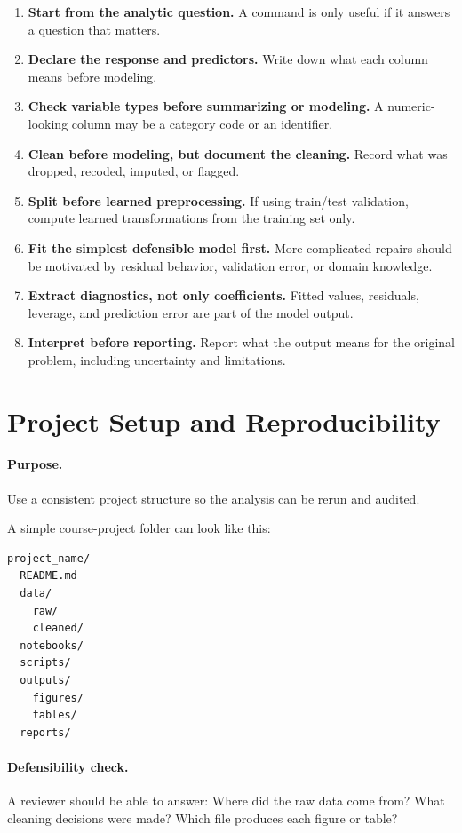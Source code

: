 \begin{enumerate}
  \item \textbf{Start from the analytic question.}  A command is only useful if it answers a question that matters.
  \item \textbf{Declare the response and predictors.}  Write down what each column means before modeling.
  \item \textbf{Check variable types before summarizing or modeling.}  A numeric-looking column may be a category code or an identifier.
  \item \textbf{Clean before modeling, but document the cleaning.}  Record what was dropped, recoded, imputed, or flagged.
  \item \textbf{Split before learned preprocessing.}  If using train/test validation, compute learned transformations from the training set only.
  \item \textbf{Fit the simplest defensible model first.}  More complicated repairs should be motivated by residual behavior, validation error, or domain knowledge.
  \item \textbf{Extract diagnostics, not only coefficients.}  Fitted values, residuals, leverage, and prediction error are part of the model output.
  \item \textbf{Interpret before reporting.}  Report what the output means for the original problem, including uncertainty and limitations.
\end{enumerate}

\section{Project Setup and Reproducibility}
\label{app:cookbook-project-setup}

\paragraph{Purpose.} Use a consistent project structure so the analysis can be rerun and audited.

A simple course-project folder can look like this:

\begin{verbatim}
project_name/
  README.md
  data/
    raw/
    cleaned/
  notebooks/
  scripts/
  outputs/
    figures/
    tables/
  reports/
\end{verbatim}

\paragraph{Defensibility check.} A reviewer should be able to answer: Where did the raw data come from? What cleaning decisions were made? Which file produces each figure or table?

